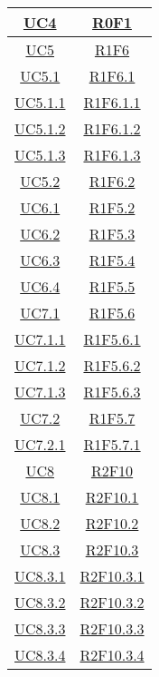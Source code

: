 \begin{longtable}{|c|c|}
	\hline
	\hyperlink{UC4}{UC4} & \hyperlink{R0F1}{R0F1}\\
	\hline
	\hyperlink{UC5}{UC5} & \hyperlink{R1F6}{R1F6}\\
	\hline
	\hyperlink{UC5.1}{UC5.1} & \hyperlink{R1F6.1}{R1F6.1}\\
	\hline
	\hyperlink{UC5.1.1}{UC5.1.1} & \hyperlink{R1F6.1.1}{R1F6.1.1}\\
	\hline
	\hyperlink{UC5.1.2}{UC5.1.2} & \hyperlink{R1F6.1.2}{R1F6.1.2}\\
	\hline
	\hyperlink{UC5.1.3}{UC5.1.3} & \hyperlink{R1F6.1.3}{R1F6.1.3}\\
	\hline
	\hyperlink{UC5.2}{UC5.2} & \hyperlink{R1F6.2}{R1F6.2}\\
	\hline
	\hyperlink{UC6.1}{UC6.1} & \hyperlink{R1F5.2}{R1F5.2}\\
	\hline
	\hyperlink{UC6.2}{UC6.2} & \hyperlink{R1F5.3}{R1F5.3}\\
	\hline
	\hyperlink{UC6.3}{UC6.3} & \hyperlink{R1F5.4}{R1F5.4}\\
	\hline
	\hyperlink{UC6.4}{UC6.4} & \hyperlink{R1F5.5}{R1F5.5}\\
	\hline
	\hyperlink{UC7.1}{UC7.1} & \hyperlink{R1F5.6}{R1F5.6}\\
	\hline
	\hyperlink{UC7.1.1}{UC7.1.1} & \hyperlink{R1F5.6.1}{R1F5.6.1}\\
	\hline
	\hyperlink{UC7.1.2}{UC7.1.2} & \hyperlink{R1F5.6.2}{R1F5.6.2}\\
	\hline
	\hyperlink{UC7.1.3}{UC7.1.3} & \hyperlink{R1F5.6.3}{R1F5.6.3}\\
	\hline
	\hyperlink{UC7.2}{UC7.2} & \hyperlink{R1F5.7}{R1F5.7}\\
	\hline
	\hyperlink{UC7.2.1}{UC7.2.1} & \hyperlink{R1F5.7.1}{R1F5.7.1}\\
	\hline
	\hyperlink{UC8}{UC8} & \hyperlink{R2F10}{R2F10}\\
	\hline
	\hyperlink{UC8.1}{UC8.1} & \hyperlink{R2F10.1}{R2F10.1}\\
	\hline
	\hyperlink{UC8.2}{UC8.2} & \hyperlink{R2F10.2}{R2F10.2}\\
	\hline
	\hyperlink{UC8.3}{UC8.3} & \hyperlink{R2F10.3}{R2F10.3}\\
	\hline
	\hyperlink{UC8.3.1}{UC8.3.1} & \hyperlink{R2F10.3.1}{R2F10.3.1}\\
	\hline
	\hyperlink{UC8.3.2}{UC8.3.2} & \hyperlink{R2F10.3.2}{R2F10.3.2}\\
	\hline
	\hyperlink{UC8.3.3}{UC8.3.3} & \hyperlink{R2F10.3.3}{R2F10.3.3}\\
	\hline
	\hyperlink{UC8.3.4}{UC8.3.4} & \hyperlink{R2F10.3.4}{R2F10.3.4}\\

\end{longtable}
